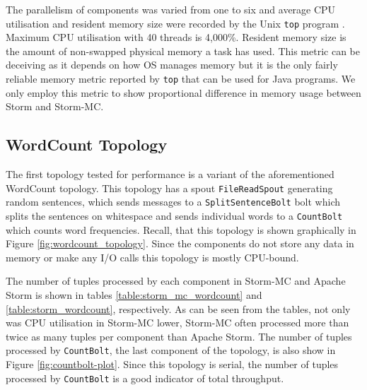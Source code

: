 The parallelism of components was varied from one to six and average CPU utilisation and resident memory size were recorded by the Unix \texttt{top} program \citep{UnixTop}. Maximum CPU utilisation with 40 threads is 4,000\%. Resident memory size is the amount of non-swapped physical memory a task has used. This metric can be deceiving as it depends on how OS manages memory but it is the only fairly reliable memory metric reported by \texttt{top} that can be used for Java programs. We only employ this metric to show proportional difference in memory usage between Storm and Storm-MC.

\subsection{WordCount Topology}

The first topology tested for performance is a variant of the aforementioned WordCount topology. This topology has a spout \texttt{FileReadSpout} generating random sentences, which sends messages to a \texttt{SplitSentenceBolt} bolt which splits the sentences on whitespace and sends individual words to a \texttt{CountBolt} which counts word frequencies. Recall, that this topology is shown graphically in Figure \ref{fig:wordcount_topology}. Since the components do not store any data in memory or make any I/O calls this topology is mostly CPU-bound.

The number of tuples processed by each component in Storm-MC and Apache Storm is shown in tables \ref{table:storm_mc_wordcount} and \ref{table:storm_wordcount}, respectively. As can be seen from the tables, not only was CPU utilisation in Storm-MC lower, Storm-MC often processed more than twice as many tuples per component than Apache Storm.  The number of tuples processed by \texttt{CountBolt}, the last component of the topology, is also show in Figure \ref{fig:countbolt-plot}. Since this topology is serial, the number of tuples processed by \texttt{CountBolt} is a good indicator of total throughput.

